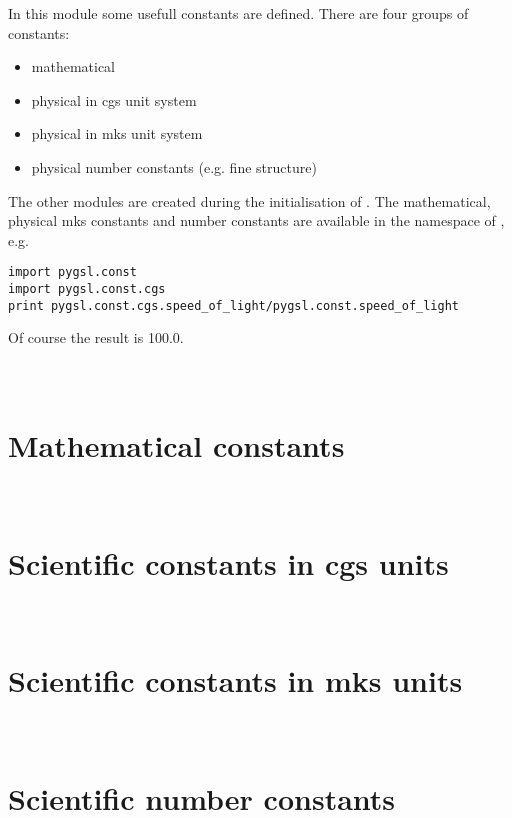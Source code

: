 
In this module some usefull constants are defined.
There are four groups of constants:

\begin{itemize}
\item mathematical
\item physical in cgs unit system
\item physical in mks unit system
\item physical number constants (e.g. fine structure)
\end{itemize}

The other modules are created during the initialisation of .
The mathematical, physical mks constants and number constants are available in the namespace of , e.g.
\begin{verbatim}
import pygsl.const
import pygsl.const.cgs
print pygsl.const.cgs.speed_of_light/pygsl.const.speed_of_light
\end{verbatim}
Of course the result is 100.0.

\section[\protect\module{pygsl.const.math} --- Mathematical constants]
{\protect{} \\ Mathematical constants} 
\label{cha:const-math-module}

\section[\protect\module{pygsl.const.cgs} --- Scientific constants in cgs units]
{\protect{} \\ Scientific constants in cgs units} 
\label{cha:const-cgs-module}

\section[\protect\module{pygsl.const.mks} --- Scientific constants in mks units]
{\protect{} \\ Scientific constants in mks units} 
\label{cha:const-mks-module}

\section[\protect\module{pygsl.const.num} --- Scientific number constants]
{\protect{} \\ Scientific number constants} 
\label{cha:const-num-module}


